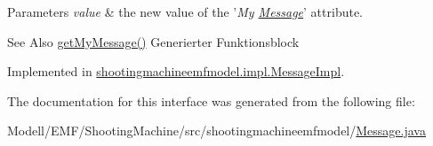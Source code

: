 \begin{DoxyParams}{Parameters}
{\em value} & the new value of the '{\itshape My \hyperlink{interfaceshootingmachineemfmodel_1_1_message}{Message}}' attribute. \\
\hline
\end{DoxyParams}
\begin{DoxySeeAlso}{See Also}
\hyperlink{interfaceshootingmachineemfmodel_1_1_message_a23c054019176f7a67e38766d19d4d1d2}{get\-My\-Message()} Generierter Funktionsblock 
\end{DoxySeeAlso}


Implemented in \hyperlink{classshootingmachineemfmodel_1_1impl_1_1_message_impl_ac484bb842fec35c55d4eed40bb9cbc84}{shootingmachineemfmodel.\-impl.\-Message\-Impl}.



The documentation for this interface was generated from the following file\-:\begin{DoxyCompactItemize}
\item 
Modell/\-E\-M\-F/\-Shooting\-Machine/src/shootingmachineemfmodel/\hyperlink{_message_8java}{Message.\-java}\end{DoxyCompactItemize}
